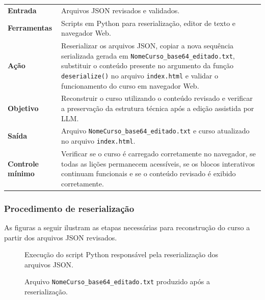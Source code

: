 \documentclass[12pt,a4paper]{article}
\newcommand{\campo}[1]{\textcolor{azulinst}{\textbf{#1}}}
\begin{document}
\begin{longtable}{p{}p{}}
\toprule

\campo{Entrada} &
Arquivos JSON revisados e validados. \\[0.05cm]

\campo{Ferramentas} &
Scripts em Python para reserialização, editor de texto e navegador Web. \\[0.05cm]

\campo{Ação} &
Reserializar os arquivos JSON, copiar a nova sequência serializada gerada em \texttt{NomeCurso\_base64\_editado.txt}, substituir o conteúdo presente no argumento da função \texttt{deserialize()} no arquivo \texttt{index.html} e validar o funcionamento do curso em navegador Web. \\[0.05cm]

\campo{Objetivo} &
Reconstruir o curso utilizando o conteúdo revisado e verificar a preservação da estrutura técnica após a edição assistida por LLM. \\[0.05cm]

\campo{Saída} &
Arquivo \texttt{NomeCurso\_base64\_editado.txt} e curso atualizado no arquivo \texttt{index.html}. \\[0.05cm]

\campo{Controle mínimo} &
Verificar se o curso é carregado corretamente no navegador, se todas as lições permanecem acessíveis, se os blocos interativos continuam funcionais e se o conteúdo revisado é exibido corretamente. \\[0.05cm]

\bottomrule
\end{longtable}

\subsubsection*{Procedimento de reserialização}

As figuras a seguir ilustram as etapas necessárias para reconstrução do curso a partir dos arquivos JSON revisados.

\begin{figure}[H]
    \centering
    \fbox{\rule{0pt}{7cm}\rule{0.95\textwidth}{0pt}}
    \caption{Execução do script Python responsável pela reserialização dos arquivos JSON.}
    \label{fig:reserializacao01}
\end{figure}

\begin{figure}[H]
    \centering
    \fbox{\rule{0pt}{7cm}\rule{0.95\textwidth}{0pt}}
    \caption{Arquivo \texttt{NomeCurso\_base64\_editado.txt} produzido após a reserialização.}
    \label{fig:reserializacao02}
\end{figure}
\end{document}

